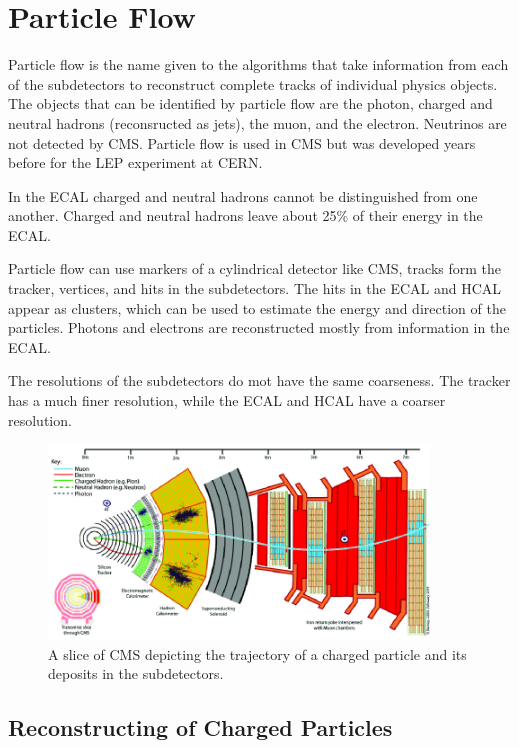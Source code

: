 \chapter{Particle Flow}\label{chap:pflow}




Particle flow is the name given to the algorithms that take information from each of the subdetectors to reconstruct complete tracks of individual physics objects. The objects that can be identified by particle flow are the photon, charged and neutral hadrons (reconsructed as jets), the muon, and the electron. Neutrinos are not detected by CMS. Particle flow is used in CMS but was developed years before for the LEP experiment at CERN.

In the ECAL charged and neutral hadrons cannot be distinguished from one another. Charged and neutral hadrons leave about 25\% of their energy in the ECAL.


Particle flow can use markers of a cylindrical detector like CMS, tracks form the tracker, vertices, and hits in the subdetectors. The hits in the ECAL and HCAL appear as clusters, which can be used to estimate the energy and direction of the particles. Photons and electrons are reconstructed mostly from information in the ECAL. 

The resolutions of the subdetectors do mot have the same coarseness. The tracker has a much finer resolution, while the ECAL and HCAL have a coarser resolution.

 \begin{figure}[h]
\centering
\includegraphics[width=0.9\textwidth]{figures/cms_slice}
\caption{A slice of CMS depicting the trajectory of a charged particle and its deposits in the subdetectors.}
\label{fig:cms_slice}
\end{figure}

\section{Reconstructing of Charged Particles}


